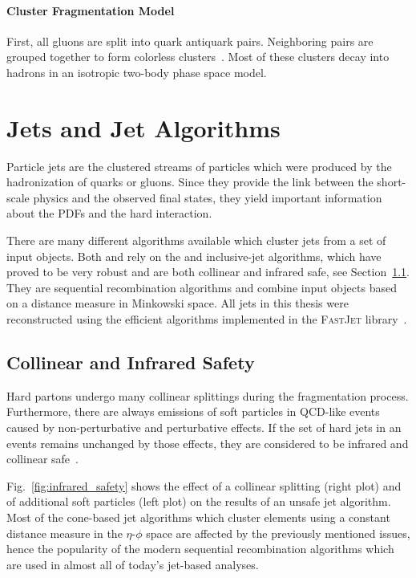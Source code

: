 \paragraph{Cluster Fragmentation Model}

First, all gluons are split into quark antiquark pairs. Neighboring pairs are
grouped together to form colorless
clusters~\cite{Webber:1983if,Marchesini:1987cf}. Most of these clusters decay
into hadrons in an isotropic two-body phase space model.

\section{Jets and Jet Algorithms}
\label{sec:jet_algorithms}

Particle jets are the clustered streams of particles which were produced by the
hadronization of quarks or gluons. Since they provide the link between the
short-scale physics and the observed final states, they yield important
information about the PDFs and the hard interaction.

There are many different algorithms available which cluster jets
from a set of input objects. Both \CMS and \ATLAS rely on the \antikt and
inclusive-\kt jet algorithms, which have proved to be very robust and are both
collinear and infrared safe, see Section~\ref{sec:coll_safety}. They are
sequential recombination algorithms and combine input objects based on a
distance measure in Minkowski space. All jets in this thesis were reconstructed using the
efficient algorithms implemented in the \textsc{FastJet} library~\cite{Cacciari:2011ma}.

\subsection{Collinear and Infrared Safety}
\label{sec:coll_safety}

Hard partons undergo many collinear splittings during the fragmentation process.
Furthermore, there are always emissions of soft particles in QCD-like events
caused by non-perturbative and perturbative effects. If the set of hard jets in an
events remains unchanged by those effects, they are considered to be infrared
and collinear safe~\cite{Salam:2009jx}.

Fig.~\ref{fig:infrared_safety} shows the effect of a collinear splitting (right
plot) and of additional soft particles (left plot) on the results of an unsafe
jet algorithm. Most of the cone-based jet algorithms which cluster elements
using a constant distance measure in the $\eta$-$\phi$ space are affected by the
previously mentioned issues, hence the popularity of the modern sequential
recombination algorithms which are used in almost all of today's jet-based
analyses.

